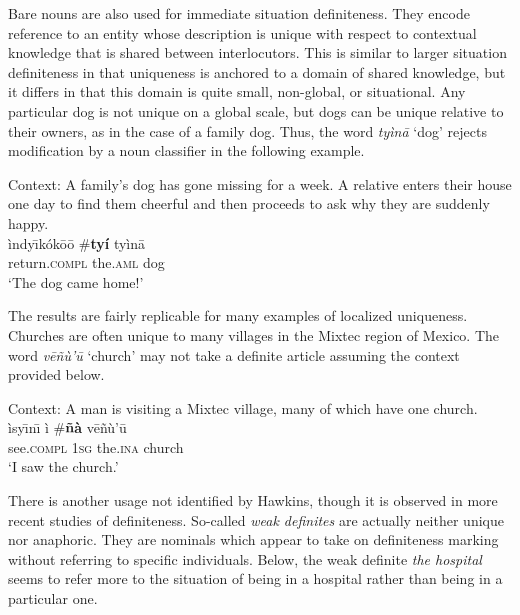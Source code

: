 \documentclass[output=paper,modfonts,nonflat]{langsci/langscibook}
\begin{document}
\z 

Bare nouns are also used for immediate situation definiteness.  They encode reference to an entity whose description is unique with respect to contextual knowledge that is shared between interlocutors.  This is similar to larger situation definiteness in that uniqueness is anchored to a domain of shared knowledge, but it differs in that this domain is quite small, non-global, or situational.  Any particular dog is not unique on a global scale, but dogs can be unique relative to their owners, as in the case of a family dog.  Thus, the word \textit{ty\`in\=a} `dog' rejects modification by a noun classifier in the following example.

\ea {}\label{ex:cisneros:61}
Context: A family's dog has gone missing for a week.  A relative enters their house one day to find them cheerful and then proceeds to ask why they are suddenly happy. \\
\gll
\`indy\=\i k\'ok\=o\=o {\op}\textnormal{\#}\textbf{ty\'i}{\cp} ty\`in\=a\\
return.\textsc{compl} \phantom{(\#}the.\textsc{aml} dog\\
\glt
`The dog came home!'
\z 

The results are fairly replicable for many examples of localized uniqueness.  Churches are often unique to many villages in the Mixtec region of Mexico.  The word \textit{v\=e\~n\`u'\=u} `church' may not take a definite article assuming the context provided below.

\ea {}\label{ex:cisneros:62}
Context: A man is visiting a Mixtec village, many of which have one church. \\
\gll
\`isy\=\i n\=\i{} \`i {\op}\textnormal{\#}\textbf{\~n\`a}{\cp} v\=e\~n\`u'\=u\\
see.\textsc{compl} 1\textsc{sg} \phantom{(\#}the.\textsc{ina} church\\
\glt
`I saw the church.'
\z 

There is another usage not identified by Hawkins, though it is observed in more recent studies of definiteness.  So-called \textit{weak definites} \citep{Carlson2006} are actually neither unique nor anaphoric.  They are nominals which appear to take on definiteness marking without referring to specific individuals.  Below, the weak definite \textit{the hospital} seems to refer more to the situation of being in a hospital rather than being in a particular one.
\end{document}
